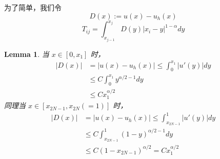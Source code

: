 \documentclass{ctexart}
\newtheorem{lemma}[theorem]{Lemma}
\theoremstyle{definition}
\theoremstyle{remark}
\numberwithin{equation}{section}
\begin{document}
为了简单，我们令
\begin{equation}
    D(x) := u(x) - u_h(x)
\end{equation}
\begin{equation}
    T_{ij} = \int_{x_{j-1}}^{x_{j}} D(y) |x_i - y|^{1-\alpha} dy
\end{equation}




\begin{lemma} \label{lmm:Dx1}
    当 \(x\in [0, x_1]\) 时，
    \begin{equation}
        \begin{aligned}
            |D(x)| & = |u(x) - u_h(x)|  \le \int_0^{x_1} |u'(y)| dy \\
            & \le C \int_0^{x_1} y^{\alpha/2-1} dy           \\
            & \le C x_1^{\alpha/2}
        \end{aligned}
    \end{equation}
    同理当 \(x\in [x_{2N-1}, x_{2N}(=1)]\) 时，
    \begin{equation}
        \begin{aligned}
            |D(x)| & = |u(x) - u_h(x)|  \le \int_{x_{2N-1}}^{1} |u'(y)| dy \\
            & \le C \int_{x_{2N-1}}^{1} (1-y)^{\alpha/2-1} dy           \\
            & \le C (1-x_{2N-1})^{\alpha/2} = C x_1^{\alpha/2}
        \end{aligned}
    \end{equation}
\end{lemma}
\end{document}
